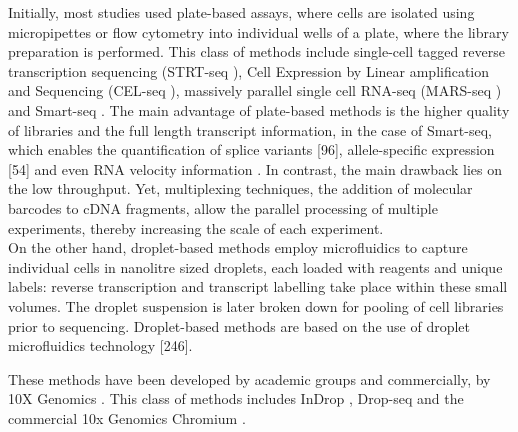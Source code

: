 Initially, most studies used plate-based assays, where cells are isolated using micropipettes or flow cytometry into individual wells of a plate, where the library preparation is performed.
This class of methods include single-cell tagged reverse transcription sequencing (STRT-seq \cite{islam2011characterization}), Cell Expression by Linear amplification and Sequencing (CEL-seq \cite{hashimshony2012cel}), massively parallel single cell RNA-seq (MARS-seq \cite{jaitin2014massively}) and Smart-seq \cite{ramskold2012full, picelli2013smart, hagemann2020single}. 
The main advantage of plate-based methods is the higher quality of libraries and the full length transcript information, in the case of Smart-seq, which enables the quantification of splice variants [96], allele-specific expression [54] and even RNA velocity information \cite{la2018rna}. 
In contrast, the main drawback lies on the low throughput.
Yet, multiplexing techniques, the addition of molecular barcodes to cDNA fragments, allow the parallel processing of multiple experiments, thereby increasing the scale of each experiment.\\

On the other hand, droplet-based methods employ microfluidics to capture individual cells in nanolitre sized droplets, each loaded with reagents and unique labels: reverse transcription and transcript labelling take place within these small volumes.
The droplet suspension is later broken down for pooling of cell libraries prior to sequencing. 
Droplet-based methods are based on the use of droplet microfluidics technology [246]. 


These methods have been developed by academic groups \cite{macosko2015highly, klein2015droplet} and commercially, by 10X Genomics \cite{zheng2017massively}.
This class of methods includes InDrop \cite{klein2015droplet}, Drop-seq \cite{macosko2015highly} and the commercial 10x Genomics Chromium \cite{zheng2017massively}. 

